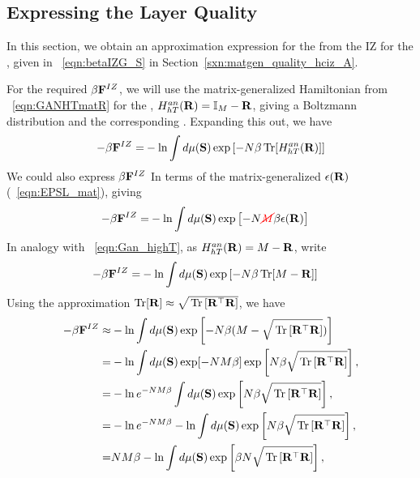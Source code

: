 \subsection{Expressing the Layer Quality}
\label{sxn:quality}

In this section, we obtain an approximation expression for the \LayerQualitySquared from the IZ \FreeEnergy for the \GeneralizationError, 
given in \EQN~\ref{eqn:betaIZG_S} in Section~\ref{sxn:matgen_quality_hciz_A}.

For the required \FreeEnergy $\beta\mathbf{F}^{IZ}$, we will use the matrix-generalized Hamiltonian
from \EQN~\ref{eqn:GANHTmatR} for the
\LayerQuality, $H^{an}_{hT}(\mathbf{R})=\mathbb{I}_{M}-\mathbf{R}$,
giving a  Boltzmann distribution and the corresponding \ThermalAverage.  
Expanding this out, we have
\begin{align}
  \label{eqn:IZFE0}
  -\beta\mathbf{F}^{IZ} =& -  \ln \int d\mu(\mathbf{S}) \exp\left[-N\beta \operatorname{Tr}[H^{an}_{hT}(\mathbf{R})]  \right] \\
\end{align}
We could also express $\beta\mathbf{F}^{IZ}$ In terms of the matrix-generalized \EffectivePotential $\epsilon(\mathbf{R})$
(\EQN~\ref{eqn:EPSL_mat}), giving
\begin{align}
  -\beta\mathbf{F}^{IZ} =& -  \ln \int d\mu(\mathbf{S}) \exp\left[-N{\color{red}\sf{\cancel{M}}}\beta \epsilon(\mathbf{R})  \right] 
\end{align}
In analogy with \EQN~\ref{eqn:Gan_highT}, 
as $H^{an}_{hT}(\mathbf{R})=M-\mathbf{R}$,  write
\begin{align}
-\beta\mathbf{F}^{IZ}  =& -  \ln \int d\mu(\mathbf{S}) \exp\left[-N\beta \operatorname{Tr}[M-\mathbf{R}]  \right] 
\end{align}
Using the approximation $\operatorname{Tr}[\mathbf{R}]\approx\sqrt{\mbox{}\operatorname{Tr}\left[\mathbf{R}^{\top}\mathbf{R}\right]}$, we have
\begin{align}
  -\beta\mathbf{F}^{IZ} 
\approx& - \ln \int d\mu(\mathbf{S}) \exp\left[-N\beta(M-\sqrt{\mbox{}\operatorname{Tr}\left[\mathbf{R}^{\top}\mathbf{R}\right]} ) \right] \\ 
\label{eqn:IZFE1}
=& -  \ln \int d\mu(\mathbf{S}) \exp[-NM\beta]\exp\left[N\beta\sqrt{\mbox{}\operatorname{Tr}\left[\mathbf{R}^{\top}\mathbf{R}\right]}\right], \\
\label{eqn:IZFE2}
=& -  \ln e^{-NM\beta} \int d\mu(\mathbf{S}) \exp\left[N\beta\sqrt{\mbox{}\operatorname{Tr}\left[\mathbf{R}^{\top}\mathbf{R}\right]}\right], \\
\label{eqn:IZFE3}
=& -  \ln e^{-NM\beta} - \ln \int d\mu(\mathbf{S}) \exp\left[N\beta\sqrt{\mbox{}\operatorname{Tr}\left[\mathbf{R}^{\top}\mathbf{R}\right]}\right], \\
\label{eqn:IZFE4}
=& NM\beta - \ln \int d\mu(\mathbf{S}) \exp\left[\beta N\sqrt{\mbox{}\operatorname{Tr}\left[\mathbf{R}^{\top}\mathbf{R}\right]}\right], 
\end{align}


